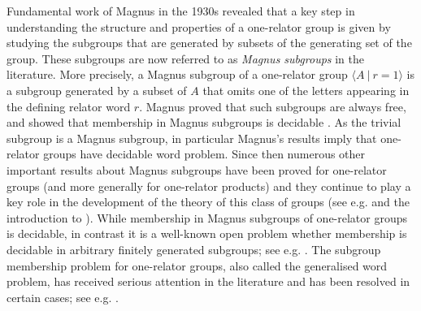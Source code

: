 \documentclass[11pt]{amsart}
\newcommand{\Gpres}[2]{\bigl\langle #1\:|\:#2 \bigr\rangle}
\theoremstyle{plain}
\theoremstyle{definition}
\begin{document}
Fundamental work of Magnus in the 1930s revealed that a key step in understanding the structure and properties of a one-relator group is given by studying the subgroups that are generated by subsets of the generating set of the group. These subgroups are now referred to as \emph{Magnus subgroups} in the literature. More precisely, a Magnus subgroup of a one-relator group $\Gpres{A}{r=1}$ is a subgroup generated by a subset of $A$ that omits one of the letters appearing in the defining relator word $r$. Magnus proved that such subgroups are always free, and showed that membership in Magnus subgroups is decidable \cite{Magnus30, Magnus1932}. 
As the trivial subgroup is a Magnus subgroup, in particular Magnus's results imply that one-relator groups have decidable word problem. 
Since then numerous other important results about Magnus subgroups have been proved for one-relator groups (and more generally for one-relator products) and they continue to play a key role in the development of the theory of this class of groups (see e.g. \cite{linton2025theory} and the introduction to \cite{Howie2025}). While membership in Magnus subgroups of one-relator groups is decidable, in contrast it is a well-known open problem whether membership is decidable in arbitrary finitely generated subgroups; see e.g. \cite[Question 2.8.7]{linton2025theory}. The subgroup membership problem for one-relator groups, also called the generalised word problem, has received serious attention in the literature and has been resolved in certain cases; see e.g.  
\cite{hruska2001towers,
kapovich2005genericity, 
lauer2013cubulating, mccammond2005coherence}.  
\end{document}
